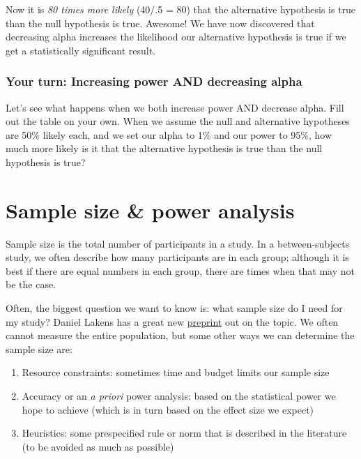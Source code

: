 \documentclass[
]{book}
\providecommand{\tightlist}{%
  \setlength{\itemsep}{0pt}\setlength{\parskip}{0pt}}
\begin{document}
Now it is \emph{80 times more likely} (40/.5 = 80) that the alternative hypothesis is true than the null hypothesis is true. Awesome! We have now discovered that decreasing alpha increases the likelihood our alternative hypothesis is true if we get a statistically significant result.

\hypertarget{your-turn-increasing-power-and-decreasing-alpha}{%
\subsubsection{Your turn: Increasing power AND decreasing alpha}\label{your-turn-increasing-power-and-decreasing-alpha}}

Let's see what happens when we both increase power AND decrease alpha. Fill out the table on your own. When we assume the null and alternative hypotheses are 50\% likely each, and we set our alpha to 1\% and our power to 95\%, how much more likely is it that the alternative hypothesis is true than the null hypothesis is true?

\hypertarget{sample-size-power-analysis}{%
\section{Sample size \& power analysis}\label{sample-size-power-analysis}}

Sample size is the total number of participants in a study. In a between-subjects study, we often describe how many participants are in each group; although it is best if there are equal numbers in each group, there are times when that may not be the case.

Often, the biggest question we want to know is: what sample size do I need for my study? Daniel Lakens has a great new \href{https://psyarxiv.com/9d3yf/}{preprint} out on the topic. We often cannot measure the entire population, but some other ways we can determine the sample size are:

\begin{enumerate}
\def\labelenumi{\arabic{enumi}.}
\tightlist
\item
  Resource constraints: sometimes time and budget limits our sample size
\item
  Accuracy or an \emph{a priori} power analysis: based on the statistical power we hope to achieve (which is in turn based on the effect size we expect)
\item
  Heuristics: some prespecified rule or norm that is described in the literature (to be avoided as much as possible)
\end{enumerate}
\end{document}
